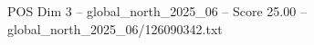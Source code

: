 \begin{textsample}{POS Dim 3 – global\_north\_2025\_06 – Score 25.00 – global\_north\_2025\_06/126090342.txt}
\end{textsample}
